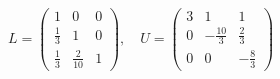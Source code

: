 \documentclass[preview]{standalone}
\begin{document}
\begin{align*}
L = \begin{pmatrix}1 & 0 & 0 \\\frac{1}{3} & 1 & 0 \\\frac{1}{3} & \frac{2}{10} & 1\end{pmatrix}, \quad U = \begin{pmatrix}3 & 1 & 1 \\0 & -\frac{10}{3} & \frac{2}{3} \\0 & 0 & -\frac{8}{3}\end{pmatrix}
\end{align*}
\end{document}
